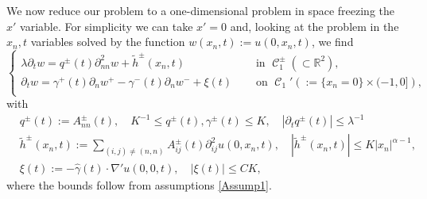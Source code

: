 \documentclass[12pt]{article}
\makeatletter
\newenvironment{customproof}[1]{%
  \par\pushQED{\qed}%
  \normalfont\topsep6pt \trivlist
  \item[\hskip\labelsep\itshape
    Proof of #1\@addpunct{.}]\ignorespaces
}{%
  \popQED\endtrivlist\@endpefalse
}
\numberwithin{Theorem}{section}
\theoremstyle{definition}
\theoremstyle{remark}
\numberwithin{equation}{section}
\DeclareMathOperator{\C}{\mathcal{C}}
\newcommand{\p}{\partial}
\makeatother
\begin{document}
\begin{customproof}{Theorem \ref{Thm:C1gamma}}
We now reduce our problem to a one-dimensional problem in space freezing the $x'$ variable. For simplicity we can take $x'=0$ and, looking at the problem in the $x_n,t$ variables solved by the function $w(x_n,t):=u(0,x_n,t)$, we find
\begin{equation} \label{eq:1d_transmission}
    \begin{cases}
        \lambda \p_t w = q^{\pm}(t) \p_{nn}^2w + \tilde{h}^{\pm}(x_n,t) \quad &\text{ in }\C_{1}^{\pm} \left(\subset \mathbb{R}^2 \right), \\
        \p_t w=\gamma^{+}( t) \p_{n}w^+ - \gamma^{-}( t) \p_n w^-  + \xi(t)  \quad &\text{ on }\C_{1}' \left( := \{x_n=0 \} \times (-1,0] \right) , \\
    \end{cases}
\end{equation}
with
\begin{equation}
    \begin{aligned} &q^{\pm}(t):=A^\pm_{nn}(t), \quad K^{-1} \leq q^{\pm}(t),\gamma^\pm(t) \leq K, \quad  |\p_t q^{\pm}(t)| \leq \lambda^{-1}  \\
        &\tilde{h}^\pm(x_n,t):= \sum_{(i,j) \neq (n,n)} A_{ij}^{\pm}(t) \p_{ij}^2 u(0,x_n,t), \quad |\tilde{h}^\pm(x_n,t)| \leq K |x_n|^{{ \alpha}-1}, \\
        &\xi(t):= - \hat\gamma(t)\cdot \nabla'u(0,0,t), \quad |\xi(t)| \leq CK,
    \end{aligned}
\end{equation}
 where the bounds follow from assumptions \eqref{Assump1}. 



\end{customproof}
\end{document}
